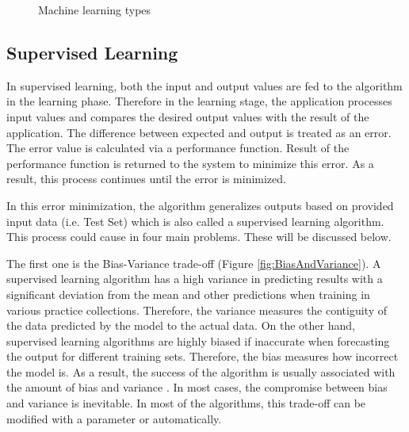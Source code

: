 \begin{figure}[htbp]
\centering
{}
\caption{Machine learning types}
\label{fig:MachineLearningTypes}
\end{figure}

\subsection{Supervised Learning}

In supervised learning, both the input and output values are fed to the algorithm in the learning phase. Therefore in the learning stage, the application processes input values and compares the desired output values with the result of the application. The difference between expected and output is treated as an error. The error value is calculated via a performance function. Result of the performance function is returned to the system to minimize this error. As a result, this process continues until the error is minimized.

In this error minimization, the algorithm generalizes outputs based on provided input data (i.e. Test Set) which is also called a supervised learning algorithm. This process could cause in four main problems. These will be discussed below.

The first one is the Bias-Variance trade-off \cite{geman1992neural} (Figure \ref{fig:BiasAndVariance}). A supervised learning algorithm has a high variance in predicting results with a significant deviation from the mean and other predictions when training in various practice collections. Therefore, the variance measures the contiguity of the data predicted by the model to the actual data. On the other hand, supervised learning algorithms are highly biased if inaccurate when forecasting the output for different training sets. Therefore, the bias measures how incorrect the model is. As a result, the success of the algorithm is usually associated with the amount of bias and variance \cite{james2003variance}. In most cases, the compromise between bias and variance is inevitable. In most of the algorithms, this trade-off can be modified with a parameter or automatically. 

